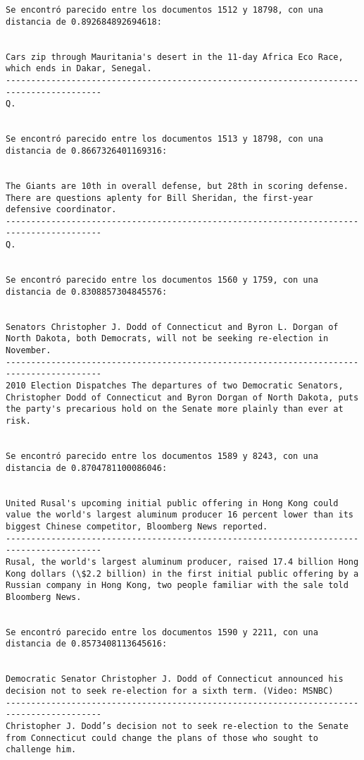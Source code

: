 \documentclass[11pt]{article}
\begin{document}
\begin{Verbatim}[commandchars=\\\{\}]
Se encontró parecido entre los documentos 1512 y 18798, con una distancia de 0.892684892694618:


Cars zip through Mauritania's desert in the 11-day Africa Eco Race, which ends in Dakar, Senegal.
-----------------------------------------------------------------------------------------
Q.


Se encontró parecido entre los documentos 1513 y 18798, con una distancia de 0.8667326401169316:


The Giants are 10th in overall defense, but 28th in scoring defense. There are questions aplenty for Bill Sheridan, the first-year defensive coordinator.
-----------------------------------------------------------------------------------------
Q.


Se encontró parecido entre los documentos 1560 y 1759, con una distancia de 0.8308857304845576:


Senators Christopher J. Dodd of Connecticut and Byron L. Dorgan of North Dakota, both Democrats, will not be seeking re-election in November. 
-----------------------------------------------------------------------------------------
2010 Election Dispatches The departures of two Democratic Senators, Christopher Dodd of Connecticut and Byron Dorgan of North Dakota, puts the party's precarious hold on the Senate more plainly than ever at risk.


Se encontró parecido entre los documentos 1589 y 8243, con una distancia de 0.8704781100086046:


United Rusal's upcoming initial public offering in Hong Kong could value the world's largest aluminum producer 16 percent lower than its biggest Chinese competitor, Bloomberg News reported.
-----------------------------------------------------------------------------------------
Rusal, the world's largest aluminum producer, raised 17.4 billion Hong Kong dollars (\$2.2 billion) in the first initial public offering by a Russian company in Hong Kong, two people familiar with the sale told Bloomberg News.


Se encontró parecido entre los documentos 1590 y 2211, con una distancia de 0.8573408113645616:


Democratic Senator Christopher J. Dodd of Connecticut announced his decision not to seek re-election for a sixth term. (Video: MSNBC)
-----------------------------------------------------------------------------------------
Christopher J. Dodd’s decision not to seek re-election to the Senate from Connecticut could change the plans of those who sought to challenge him.



\end{Verbatim}
\end{document}

